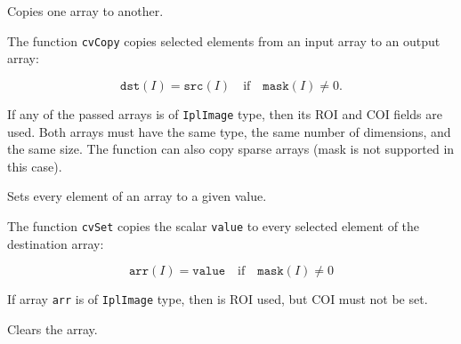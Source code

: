 Copies one array to another.


\begin{description}
\end{description}


The function \texttt{cvCopy} copies selected elements from an input array to an output array:

\[
\texttt{dst}(I)=\texttt{src}(I) \quad \text{if} \quad \texttt{mask}(I) \ne 0.
\]

If any of the passed arrays is of \texttt{IplImage} type, then its ROI
and COI fields are used. Both arrays must have the same type, the same
number of dimensions, and the same size. The function can also copy sparse
arrays (mask is not supported in this case).

\label{Set}

Sets every element of an array to a given value.


\begin{description}
\end{description}


The function \texttt{cvSet} copies the scalar \texttt{value} to every selected element of the destination array:

\[
\texttt{arr}(I)=\texttt{value} \quad \text{if} \quad \texttt{mask}(I) \ne 0
\]

If array \texttt{arr} is of \texttt{IplImage} type, then is ROI used, but COI must not be set.

\label{SetZero}

Clears the array.


